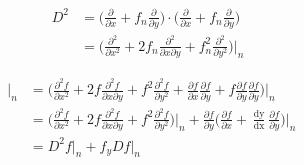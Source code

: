 \documentclass[12 pt]{article}
\begin{document}
{
\large
\begin{equation}
\begin{split}
D^{2} &= \bigg(\frac{\partial }{\partial x} + f_{n}\frac{\partial }{\partial y}\bigg)\cdot \bigg(\frac{\partial }{\partial x} + f_{n}\frac{\partial }{\partial y}\bigg)\\
	  &= \Big(\frac{\partial^{2}}{\partial x^{2}} + 2f_{n}\frac{\partial^{2}}{\partial x \partial y} + f_{n}^{2}\frac{\partial^{2}}{\partial y^{2}}\Big)\Big\vert_{n}
\end{split}
\end{equation}
}

{
\large
\begin{equation*}
\begin{split}
\frac{\mathop{\mathrm{d^{2}f}}}{\mathop{\mathrm{dx^{2}}}}\Big\vert_{n} &= \Big(\frac{\partial^{2}f}{\partial x^{2}} + 2f\frac{\partial^{2}f}{\partial x \partial y} + f^{2}\frac{\partial^{2}f}{\partial y^{2}} + \frac{\partial f}{\partial x}\frac{\partial f}{\partial y} + f\frac{\partial f}{\partial y}\frac{\partial f}{\partial y}\Big)\Big\vert_{n}\\
																	   &= \Big(\frac{\partial^{2}f}{\partial x^{2}} + 2f\frac{\partial^{2}f}{\partial x \partial y} + f^{2}\frac{\partial^{2}f}{\partial y^{2}}\Big)\Big\vert_{n} + \frac{\partial f}{\partial y}\bigg(\frac{\partial f}{\partial x} + \frac{\mathop{\mathrm{dy}}}{\mathop{\mathrm{dx}}}\frac{\partial f }{\partial y}\bigg)\Big\vert_{n}\\
																	   &=D^{2}f\Big\vert_{n}+f_{y}Df\Big\vert_{n}\\																   
\end{split}
\end{equation*}

}
\end{document}
